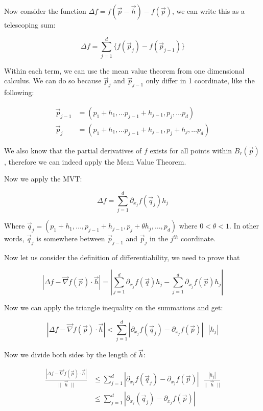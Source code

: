 \documentclass [12 pt, twoside] {book}
\newcommand\+{\text{ }}
\newcommand{\gradient}{\vec{\nabla}}
\begin{document}
Now consider the function $\Delta f = f(\vec{p} - \vec{h}) - f(\vec{p})$, we can
write this as a telescoping sum:

$$\Delta f = \sum_{j=1}^d \{f(\vec{p}_j) - f(\vec{p}_{j-1})\}$$

Within each term, we can use the mean value theorem from one dimensional
calculus. We can do so because $\vec{p}_j$ and $\vec{p}_{j - 1}$ only differ in
1 coordinate, like the following:

\begin{align*}
    \vec{p}_{j - 1} &= (p_1 + h_1, \dots p_{j-1} + h_{j-1}, \boxed{p_j}, \dots p_d)\\
    \vec{p}_{j} &= (p_1 + h_1, \dots p_{j-1} + h_{j-1}, \boxed{p_j + h_j}, \dots p_d)
\end{align*}

We also know that the partial derivatives of $f$ exists for all points within
$B_r(\vec{p})$, therefore we can indeed apply the Mean Value Theorem.

Now we apply the MVT:

$$\Delta f = \sum_{j=1}^d \partial_{x_j} f(\vec{q}_j) h_j$$

Where $\vec{q}_j = (p_1 + h_1, \dots, p_{j-1} + h_{j-1}, p_j + \theta h_j,
\dots, p_d)$ where $0 < \theta < 1$. In other words, $\vec{q}_j$ is somewhere
between $\vec{p}_{j-1}$ and $\vec{p}_{j}$ in the $j^{th}$ coordinate.

Now let us consider the definition of differentiability, we need to prove that 


$$|\Delta f - \vec{\nabla}f(\vec{p}) \cdot \vec{h}| = |\sum_{j = 1}^d
\partial_{x_j} f(\vec{q}) h_j - \sum_{j = 1}^d \partial_{x_j} f(\vec{p}) h_j|$$

Now we can apply the triangle inequality on the summations and get:

$$|\Delta f - \vec{\nabla}f(\vec{p}) \cdot \vec{h}| < \sum_{j=1}^d |\partial_{x_j} f(\vec{q}_j) - \partial_{x_j} f(\vec{p})|
\+ |h_j|$$

Now we divide both sides by the length of $\vec{h}$:

\begin{align*}
    \frac{|\Delta f - \gradient f(\vec{p}) \cdot \vec{h}|}{||\+\vec{h}\+||} &\leq
    \sum_{j=1}^d |\partial_{x_j} f(\vec{q}_j) - \partial_{x_j} f(\vec{p})| \+
    \frac{|h_j|}{||\+\vec{h}\+||}\\
    &\leq \sum_{j=1}^d |\partial_{x_j} (\vec{q}_j) - \partial_{x_j} f(\vec{p})|
\end{align*}
\end{document}
